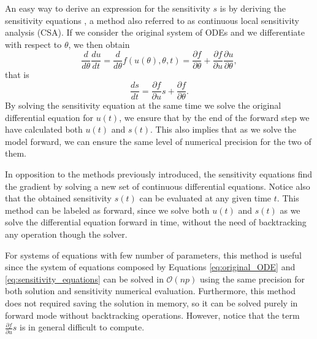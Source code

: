 An easy way to derive an expression for the sensitivity $s$ is by deriving the sensitivity equations \cite{ramsay2017dynamic}, a method also referred to as continuous local sensitivity analysis (CSA). 
If we consider the original system of ODEs and we differentiate with respect to $\theta$, we then obtain
\begin{equation}
 \frac{d}{d\theta} \frac{du}{dt} 
 =
 \frac{d}{d\theta} f(u(\theta), \theta, t)
 = 
 \frac{\partial f}{\partial \theta}
 + 
 \frac{\partial f}{\partial u} \frac{\partial u}{\partial \theta},
\end{equation}
that is
\begin{equation}
 \frac{ds}{dt} = \frac{\partial f}{\partial u} s + \frac{\partial f}{\partial \theta}.
 \label{eq:sensitivity_equations}
\end{equation}
By solving the sensitivity equation at the same time we solve the original differential equation for $u(t)$, we ensure that by the end of the forward step we have calculated both $u(t)$ and $s(t)$. 
This also implies that as we solve the model forward, we can ensure the same level of numerical precision for the two of them.

In opposition to the methods previously introduced, the sensitivity equations find the gradient by solving a new set of continuous differential equations.
Notice also that the obtained sensitivity $s(t)$ can be evaluated at any given time $t$. This method can be labeled as forward, since we solve both $u(t)$ and $s(t)$ as we solve the differential equation forward in time, without the need of backtracking any operation though the solver.

For systems of equations with few number of parameters, this method is useful since the system of equations composed by Equations \eqref{eq:original_ODE} and \eqref{eq:sensitivity_equations} can be solved in $\mathcal O (np)$ using the same precision for both solution and sensitivity numerical evaluation. 
Furthermore, this method does not required saving the solution in memory, so it can be solved purely in forward mode without backtracking operations.
However, notice that the term $\frac{\partial f}{\partial u} s $ is in general difficult to compute. 

